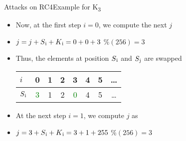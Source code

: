 \documentclass[
	aspectratio=169,	%
	onlytextwidth,		%
	t					%
	]{beamer}
\begin{document}
\begin{frame}[fragile]{Attacks on RC4}{Example for K\textsubscript{3}}
	\begin{itemize}
		\item Now, at the first step $i=0$, we compute the next $j$
		\item $j = j + S\textsubscript{i} + K\textsubscript{i} = 0 + 0 + 3$ $\% (256) = 3$
		\item Thus, the elements at position $S\textsubscript{i}$ and $S\textsubscript{j}$ are swapped
		\medskip
		\begin{table}[h!]
			\begin{center}
			  \begin{tabular}{l|c|c|c|c|c|c|c}
				$i$ & 0 & 1 & 2 & 3 & 4 & 5 & \dots\\
				\hline
				$S\textsubscript{i}$ & \textcolor{green}{3} & 1 & 2 & \textcolor{green}{0} & 4 & 5 & \dots\\
			  \end{tabular}
			\end{center}
		  \end{table}
		\item At the next step $i = 1$, we compute $j$ as
		\item $j = 3 + S\textsubscript{i} + K\textsubscript{i} = 3 + 1 + 255$ $\% (256) = 3$
	\end{itemize}
\end{frame}
\end{document}
